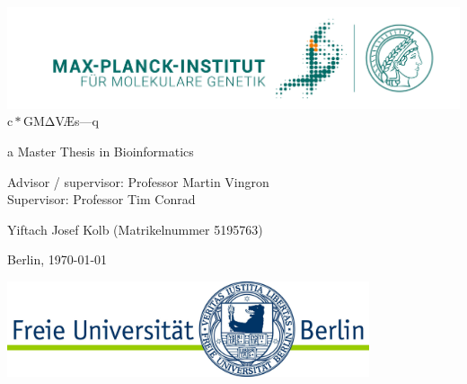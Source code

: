 \documentclass[11pt, a4paper]{report}
\theoremstyle{plain}
\theoremstyle{definition}
\theoremstyle{remark}
\newcommand{\scgmvae}{$\mathrm{c}{\ast}\mathrm{GM\Delta}$V{\AE}s---q}
\begin{document}
\begin{titlepage}
\begin{center}
{\includegraphics[width=1.0\textwidth]{images/MPIMG_RGB_gruen.png}}\\
\vspace*{1cm}
\Large
\scgmvae



\large
a Master Thesis in Bioinformatics
\vspace{1.0cm}

Advisor / supervisor: Professor Martin Vingron\\
Supervisor: Professor Tim Conrad

\vfill

Yiftach Josef Kolb
(Matrikelnummer 5195763)

Berlin, \today

\vfill
{\includegraphics[width=0.8\textwidth]{images/fu-logo_bildschirm_RGB1.jpg}}
\end{center}
\normalsize
\end{titlepage}

\end{document}

